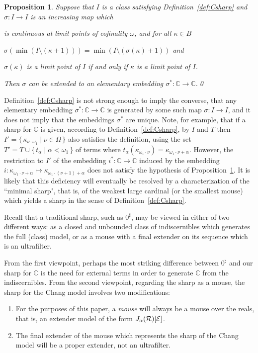 \documentclass[
twoside,
]{article}
\newenvironment{myinparaenum}{\begin{inparaenum}[\upshape(i)]
}{\end{inparaenum}}
\newtheorem{proposition}[theorem]{Proposition}
\theoremstyle{definition}
\theoremstyle{remark}
\newcommand{\ords}{\Omega}
\newcommand\reals{\mathcal{R}}
\newcommand{\set}[1]{\{\,#1\,\}}
\newcommand\chang{\mathbb{C}}
\begin{document}
\begin{proposition}\label{thm:sharpEmbed}
  Suppose that $I$ is a class satisfying Definition~\ref{def:Csharp}
  and $\sigma\colon I\to I$ is an increasing map which 
  \begin{myinparaenum}
  \item is continuous at limit points of cofinality $\omega$, and for all $\kappa\in B$ 
  \item $\sigma(\min(I\setminus(\kappa+1)))=\min(I\setminus(\sigma( \kappa)+1))$ and
  \item $\sigma(\kappa)$ is a limit point of $I$ if and only if
    $\kappa$ is a limit point of $I$.
  \end{myinparaenum}
  Then $\sigma$
  can be extended to an elementary embedding $\sigma^*\colon\chang\to\chang$.\qed
\end{proposition}

Definition~\ref{def:Csharp} is not strong enough to imply the converse, that any
elementary embedding $\sigma^*\colon \chang\to\chang$ is generated by
some such map $\sigma\colon I\to I$, and it does not  imply that the
embeddings $\sigma^*$
are unique.   Note, for example, that if a sharp for $\chang$ is
given, according to Definition~\ref{def:Csharp}, by $I$ and $T$ then 
$I'=\set{\kappa_{\nu\cdot\omega_1}\mid \nu\in\ords}$ 
also satisfies the definition, using the set
$T'=T\cup\set{t_{\alpha}\mid\alpha<\omega_1}$ of terms where
$t_{\alpha}(\kappa_{\omega_1\cdot\nu})=\kappa_{\omega_1\cdot\nu+\alpha}$.
However, the restriction to $I'$ of the embedding $i^*\colon\chang\to\chang$ induced by the
embedding 
$i\colon\kappa_{\omega_1\cdot\nu+\alpha}\mapsto\kappa_{\omega_1\cdot(\nu+1)+\alpha}$
does not satisfy the hypothesis of Proposition~\ref{thm:sharpEmbed}.
It is
likely that this deficiency will eventually  be resolved by a
characterization of the ``minimal sharp", that is, of the weakest large
cardinal (or the smallest mouse) which yields a sharp
in the sense of Definition~\ref{def:Csharp}. 

Recall that a traditional sharp, such as $0^{\sharp}$, may be viewed
in either of two different ways:  as a closed and unbounded
class of indiscernibles which generates the full (class) model, or as
a mouse with a final extender on its sequence which is an ultrafilter.

From the first viewpoint, perhaps the most striking difference between
$0^{\sharp}$ and our sharp for $\chang$ is the need for external terms in order to
generate $\chang$ from the indiscernibles.
From the second viewpoint,
regarding the sharp as a mouse, the sharp for the Chang model  involves two modifications:
\begin{enumerate}
\item
  For the purposes of this paper, a \emph{mouse}  will always be a
  mouse over the reals, that is, an extender model of the form $J_{\alpha}(\reals)[{\cal E}]$.
\item The final extender of the mouse which represents the sharp of
  the Chang model will be a proper extender, not an ultrafilter.
\end{enumerate}
\end{document}
